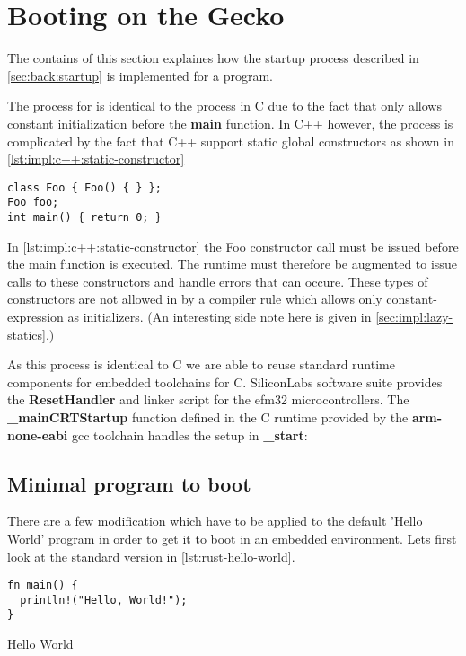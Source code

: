 \section{Booting \rust on the Gecko}

The contains of this section explaines how the startup process described in \autoref{sec:back:startup} is implemented for a \rust program.

The process for \rust is identical to the process in C due to the fact that \rust only allows constant initialization before the \textbf{main} function.
In C++ however, the process is complicated by the fact that C++ support static global constructors as shown in \autoref{lst:impl:c++:static-constructor}

\begin{listing}[H]
  \begin{verbatim}
class Foo { Foo() { } };
Foo foo;
int main() { return 0; }
  \end{verbatim}
  \caption{}
  \label{lst:impl:c++:static-constructor}
\end{listing}

In \autoref{lst:impl:c++:static-constructor} the Foo constructor call must be issued before the main function is executed.
The runtime must therefore be augmented to issue calls to these constructors and handle errors that can occure.
These types of constructors are not allowed in \rust by a compiler rule which allows only constant-expression as initializers.
(An interesting side note here is given in \autoref{sec:impl:lazy-statics}.)

As this process is identical to C we are able to reuse standard runtime components for embedded toolchains for C.
SiliconLabs software suite provides the \textbf{ResetHandler} and linker script for the efm32 microcontrollers.
The \textbf{\_mainCRTStartup} function defined in the C runtime provided by the \textbf{arm-none-eabi} gcc toolchain handles the setup in \textbf{\_start}:

\subsection{Minimal \rust program to boot}

There are a few modification which have to be applied to the default 'Hello World' program in order to get it to boot in an embedded environment.
Lets first look at the standard version in \autoref{lst:rust-hello-world}.

\begin{listing}[H]
\begin{verbatim}
fn main() {
  println!("Hello, World!");
}
\end{verbatim}
\label{lst:rust-hello-world}
\caption{\rust Hello World}
\end{listing}

